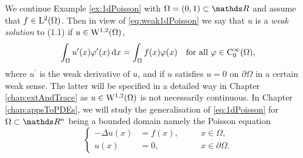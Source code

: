 \begin{ex}
  We continue Example \ref{ex:1dPoisson} with $\Omega = (0,1) \subset \R$ and assume that $f \in \mathrm{L}^2(\Omega)$.
  Then in view of \eqref{eq:weak1dPoisson} we say that $u$ is a \emph{weak solution} to (1.1) if $u \in \mathrm{W}^{1,2}(\Omega)$,
  $$
  \int_\Omega u^\prime(x) \varphi^\prime(x) \, {\operatorname{d}\!{x}} = \int_\Omega f(x) \varphi(x) \quad \text{for all } \varphi \in \mathrm{C}_0^\infty(\Omega),
  $$
  where $u^\prime$ is the weak derivative of $u$, and if $u$ satisfies $u = 0$ on $\partial \Omega$ in a certain weak sense.
  The latter will be specified in a detailed way in Chapter \ref{chap:extAndTrace} as $u \in \mathrm{W}^{1,2}(\Omega)$ is not necessarily continuous.
  In Chapter \ref{chap:appsToPDEs}, we will study the generalisation of \eqref{eq:1dPoisson} for $\Omega \subset \R^n$ being a bounded domain namely the Poisson equation
\begin{equation*}
  \left\{
    \begin{alignedat}{2}
    -\Delta u(x) &= f(x), &&\quad x \in \Omega, \\
    u(x) &= 0, &&\quad x \in \partial\Omega.
    \end{alignedat}
    \right.
\end{equation*}
\end{ex}

